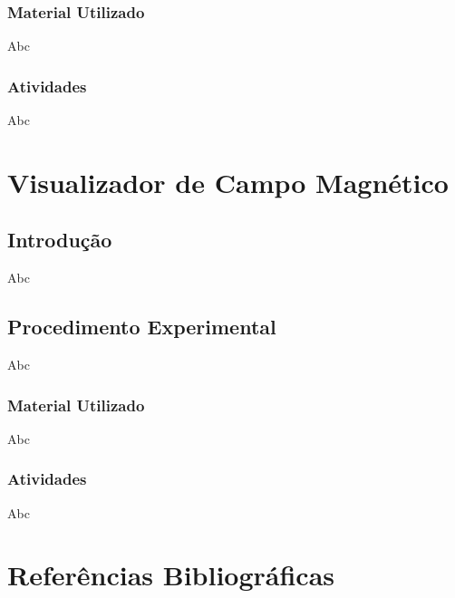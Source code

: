\documentclass[12pt,a4paper]{article}
\begin{document}
		\subsubsection{Material Utilizado}
		Abc
		\subsubsection{Atividades}
		Abc
	\section{Visualizador de Campo Magnético}
		\subsection{Introdução}
		Abc
		\subsection{Procedimento Experimental}
		Abc
		\subsubsection{Material Utilizado}
		Abc
		\subsubsection{Atividades}
		Abc
	\clearpage
	\section{Referências Bibliográficas}
\end{document}
